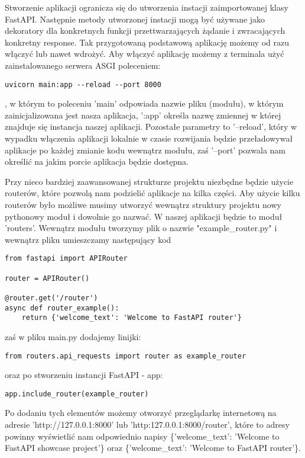 Stworzenie aplikacji ogranicza się do utworzenia instacji zaimportowanej klasy FastAPI. Następnie metody utworzonej instacji mogą być używane jako dekoratory dla konkretnych funkcji przettwarzających żądanie i zwracających konkretny response. Tak przygotowaną podstawową aplikację możemy od razu włączyć lub nawet wdrożyć. Aby włączyć aplikację możemy z terminala użyć zainstalowanego serwera ASGI poleceniem:
\begin{lstlisting}
uvicorn main:app --reload --port 8000
\end{lstlisting}
, w którym to poleceniu 'main' odpowiada nazwie pliku (modułu), w którym zainicjalizowana jest nasza aplikacja, ':app' określa nazwę zmiennej w której znajduje się instancja naszej aplikacji. Pozostałe parametry to '--reload', który w wypadku włączenia aplikacji lokalnie w czasie rozwijania będzie przeładowywał aplikacje po każdej zmianie kodu wewnątrz modułu, zaś '--port' pozwala nam określić na jakim porcie aplikacja będzie dostępna.

Przy nieco bardziej zaawansowanej strukturze projektu niezbędne będzie użycie routerów, które pozwolą nam podzielić aplikacje na kilka części. Aby użycie kilku routerów było możliwe musimy utworzyć wewnątrz struktury projektu nowy pythonowy moduł i dowolnie go nazwać. W naszej aplikacji będzie to moduł 'routers'. Wewnątrz modułu tworzymy plik o nazwie "example\_router.py" i wewnątrz pliku umieszczamy następujący kod

\begin{lstlisting}
from fastapi import APIRouter

router = APIRouter()

@router.get('/router')
async def router_example():
    return {'welcome_text': 'Welcome to FastAPI router'}
\end{lstlisting}
zaś w pliku main.py dodajemy linijki:
\begin{lstlisting}
from routers.api_requests import router as example_router
\end{lstlisting}
oraz po stworzeniu instancji FastAPI - app:
\begin{lstlisting}
app.include_router(example_router)
\end{lstlisting}
Po dodaniu tych elementów możemy otworzyć przeglądarkę internetową na adresie 'http://127.0.0.1:8000' lub 'http:127.0.0.1:8000/router', które to adresy powinny wyświetlić nam odpowiednio napisy \{'welcome\_text': 'Welcome to FastAPI showcase project'\} oraz \{'welcome\_text': 'Welcome to FastAPI router'\}.

